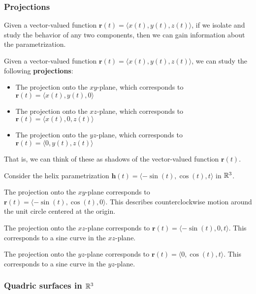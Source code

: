 \subsubsection{Projections}

Given a vector-valued function $\bm{r}(t) = \langle x(t), y(t), z(t) \rangle$, if we isolate and study the behavior of any two components, then we can gain information about the parametrization.

\begin{definition}
Given a vector-valued function $\bm{r}(t) = \langle x(t), y(t), z(t) \rangle$, we can study the following \textbf{projections}:

\begin{itemize}
    \item The projection onto the $xy$-plane, which corresponds to $\bm{r}(t) = \langle x(t), y(t), 0 \rangle$
    \item The projection onto the $xz$-plane, which corresponds to $\bm{r}(t) = \langle x(t), 0, z(t) \rangle$
     \item The projection onto the $yz$-plane, which corresponds to $\bm{r}(t) = \langle 0, y(t), z(t) \rangle$
\end{itemize}

\end{definition}

That is, we can think of these as shadows of the vector-valued function $\bm{r}(t)$.

\begin{example}
Consider the helix parametrization $\bm{h}(t) = \langle -\sin(t), \cos(t), t \rangle$ in $\mathbb{R}^3$.

The projection onto the $xy$-plane corresponds to $\bm{r}(t) = \langle -\sin(t), \cos(t), 0 \rangle$.  This describes counterclockwise motion around the unit circle centered at the origin.  

The projection onto the $xz$-plane corresponds to $\bm{r}(t) = \langle -\sin(t), 0, t\rangle$.  This corresponds to a sine curve in the $xz$-plane.

The projection onto the $yz$-plane corresponds to $\bm{r}(t) = \langle 0, \cos(t), t \rangle$.  This corresponds to a sine curve in the $yz$-plane.


\end{example}





\subsubsection{Quadric surfaces in $\mathbb{R}^3$}


